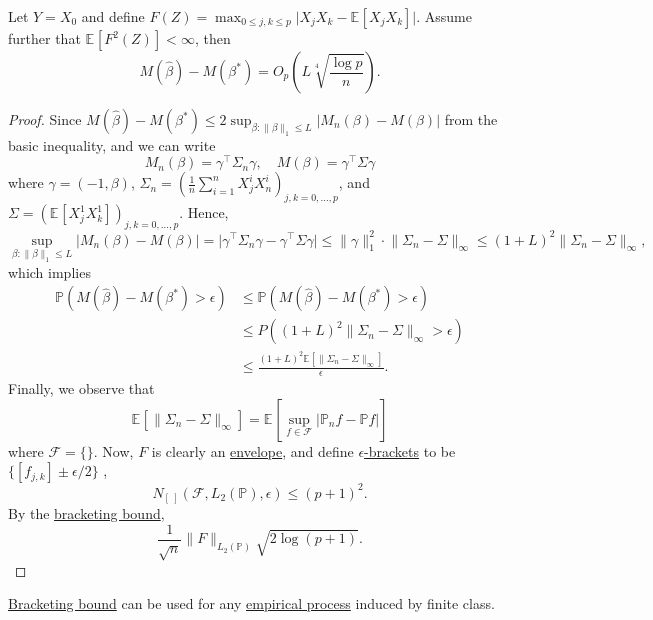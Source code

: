 \begin{eg}
	\begin{theorem}
		Let \(Y = X_0\) and define \(F(Z) = \max _{0 \leq j, k \leq p} \vert X_j X_k - \mathbb{E}_{}\left[X_j X_k \right] \vert \). Assume further that \(\mathbb{E}_{}\left[F^2(Z) \right] < \infty \), then
		\[
			M(\hat{\beta} ) - M(\beta ^{\ast} ) = O_p \left( L \sqrt[4]{\frac{\log p}{n}} \right).
		\]
	\end{theorem}
	\begin{proof}
		Since \(M(\hat{\beta} ) - M(\beta ^{\ast} ) \leq 2 \sup _{\beta \colon \lVert \beta  \rVert _1 \leq L} \vert M_n(\beta ) - M(\beta ) \vert \) from the basic inequality, and we can write
		\[
			M_n(\beta ) = \gamma ^{\top} \Sigma _n \gamma ,\quad
			M(\beta ) = \gamma ^{\top} \Sigma \gamma
		\]
		where \(\gamma = (-1, \beta )\), \(\Sigma _n = \left( \frac{1}{n} \sum_{i=1}^{n} X_j^i X_n^i \right)_{j, k = 0, \dots , p} \), and \(\Sigma = \left( \mathbb{E}_{}\left[X_j^1 X_k^1 \right] \right) _{j, k = 0, \dots , p} \). Hence,
		\[
			\sup _{\beta \colon \lVert \beta  \rVert _1 \leq L} \vert M_n(\beta ) - M(\beta ) \vert
			= \vert \gamma ^{\top} \Sigma _n \gamma - \gamma ^{\top} \Sigma \gamma  \vert
			\leq \lVert \gamma  \rVert _1^2 \cdot \lVert \Sigma _n - \Sigma  \rVert _\infty
			\leq (1 + L)^2 \lVert \Sigma _n - \Sigma  \rVert _\infty ,
		\]
		which implies
		\[
			\begin{split}
				\mathbb{P} (M(\hat{\beta} ) - M(\beta ^{\ast} ) > \epsilon )
				&\leq \mathbb{P} (M(\hat{\beta} ) - M(\beta ^{\ast} ) > \epsilon )\\
				&\leq P((1 + L)^2 \lVert \Sigma _n - \Sigma  \rVert _\infty > \epsilon )\\
				&\leq \frac{(1 + L)^2 \mathbb{E}_{}\left[\lVert \Sigma _n - \Sigma  \rVert _\infty  \right] }{\epsilon }.
			\end{split}
		\]
		Finally, we observe that
		\[
			\mathbb{E}_{}\left[\lVert \Sigma _n - \Sigma  \rVert _\infty  \right]
			= \mathbb{E}_{}\left[\sup _{f\in \mathscr{F} } \vert \mathbb{P} _n f - \mathbb{P} f \vert  \right]
		\]
		where \(\mathscr{F} = \{  \} \). Now, \(F\) is clearly an \hyperref[def:envelope]{envelope}, and define \hyperref[def:eps-bracket]{\(\epsilon\)-brackets} to be \(\{ [f_{j,k}] \pm \epsilon / 2 \} \) ,
		\[
			N_{[\ ]}(\mathscr{F} , L_2(\mathbb{P} ), \epsilon ) \leq (p + 1) ^2.
		\]
		By the \hyperref[thm:bracketing-bound]{bracketing bound},
		\[
			\frac{1}{\sqrt{n} } \lVert F \rVert _{L_2(\mathbb{P} )} \sqrt{2 \log (p + 1)}.
		\]

	\end{proof}

	\begin{remark}
		\hyperref[thm:bracketing-bound]{Bracketing bound} can be used for any \hyperref[def:EP]{empirical process} induced by finite class.
	\end{remark}
\end{eg}